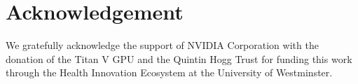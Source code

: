 \documentclass[letterpaper, 10pt, conference]{ieeeconf} %
\begin{document}

\section*{Acknowledgement}
We gratefully acknowledge the support of NVIDIA Corporation with the donation of the Titan V GPU and the Quintin Hogg Trust for funding this work through the Health Innovation Ecosystem at the University of Westminster.

\renewcommand*{\bibfont}{\small}

\printbibliography
\end{document}
